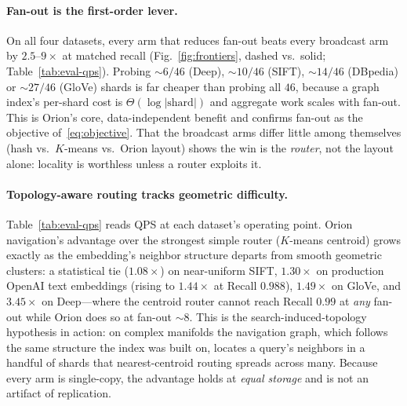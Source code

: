 \paragraph{Fan-out is the first-order lever.}
On all four datasets, every arm that reduces fan-out beats every broadcast arm by
$2.5\text{--}9\times$ at matched recall (Fig.~\ref{fig:frontiers}, dashed vs.\
solid; Table~\ref{tab:eval-qps}). Probing $\sim\!6/46$ (Deep), $\sim\!10/46$
(SIFT), $\sim\!14/46$ (DBpedia) or $\sim\!27/46$ (GloVe) shards is far cheaper
than probing all $46$, because a graph index's per-shard cost is
$\Theta(\log|\text{shard}|)$ and aggregate work scales with fan-out. This is
Orion's core, data-independent benefit and confirms fan-out as the objective
of~\eqref{eq:objective}. That the broadcast arms differ little among themselves
(hash vs.\ $K$-means vs.\ Orion layout) shows the win is the \emph{router}, not
the layout alone: locality is worthless unless a router exploits it.

\paragraph{Topology-aware routing tracks geometric difficulty.}
Table~\ref{tab:eval-qps} reads QPS at each dataset's operating point. Orion
navigation's advantage over the strongest simple router ($K$-means centroid)
grows exactly as the embedding's neighbor structure departs from smooth geometric
clusters: a statistical tie ($1.08\times$) on near-uniform SIFT, $1.30\times$ on
production OpenAI text embeddings (rising to $1.44\times$ at Recall $0.988$),
$1.49\times$ on GloVe, and $3.45\times$ on Deep---where the centroid router
cannot reach Recall $0.99$ at \emph{any} fan-out while Orion does so at fan-out
$\sim\!8$. This is the search-induced-topology hypothesis in action: on complex
manifolds the navigation graph, which follows the same structure the index was
built on, locates a query's neighbors in a handful of shards that nearest-centroid
routing spreads across many. Because every arm is single-copy, the advantage holds
at \emph{equal storage} and is not an artifact of replication.

